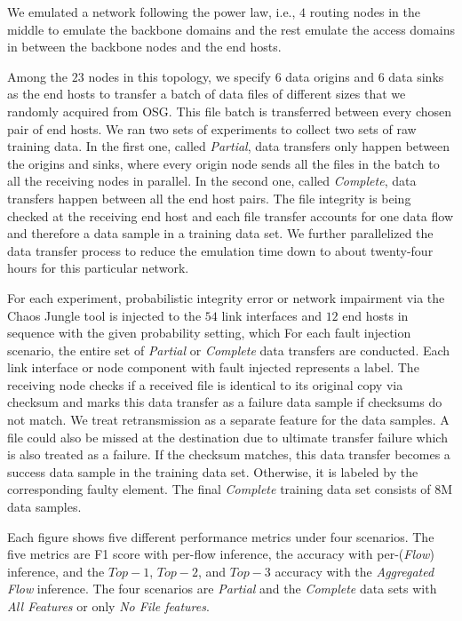 We emulated a network following the power law, i.e., $4$ routing 
nodes in the middle to emulate the backbone domains and the rest emulate the access domains in between the backbone nodes and the end hosts. 

Among the $23$ nodes in this topology, we specify $6$ data origins and $6$ data sinks as the end hosts to transfer a batch of data files of different sizes that we randomly acquired from OSG. 
This file batch is transferred between every chosen pair of end hosts. We ran two sets of experiments to collect two sets of raw training data. In the first one, called {\it Partial},
data transfers only happen between the origins and sinks, where every origin node sends all the files in the batch 
to all the receiving nodes in parallel. In the second one, called {\it Complete}, data transfers happen between all the end host pairs. 
The file integrity is being checked at the receiving end host and each file transfer accounts for one data flow and therefore 
a data sample in a training data set. We further parallelized the data transfer process to reduce the emulation time down to about twenty-four hours for this particular network.  

For each experiment, probabilistic integrity error or network impairment via the Chaos Jungle tool is injected to the $54$ link interfaces and $12$ end hosts in sequence with the given probability setting, which 
For each fault injection scenario, the entire set of {\it Partial} or {\it Complete} data transfers are conducted. Each link interface or node component with fault injected represents a label.  
The receiving node checks if a received file is identical to its original copy via checksum and marks this data transfer as a failure data sample if checksums do not match. 
We treat retransmission as a separate feature for the data samples.  A file could also be missed at the destination due to ultimate transfer failure which is also treated as a failure. 
If the checksum matches, this data transfer becomes a success data sample in the training data set. Otherwise, it is labeled by the corresponding faulty element.
The final {\it Complete} training data set consists of 8{M} data samples.

Each figure shows five different performance metrics under four scenarios. The five metrics are F1 score with per-flow inference, the accuracy with per-({\it Flow}) inference, and the $Top-1$, $Top-2$, and $Top-3$ accuracy with
the {\it Aggregated Flow} inference. The four scenarios are {\it Partial} and the {\it Complete} data sets with {\it All Features} or only {\it No File features}.


